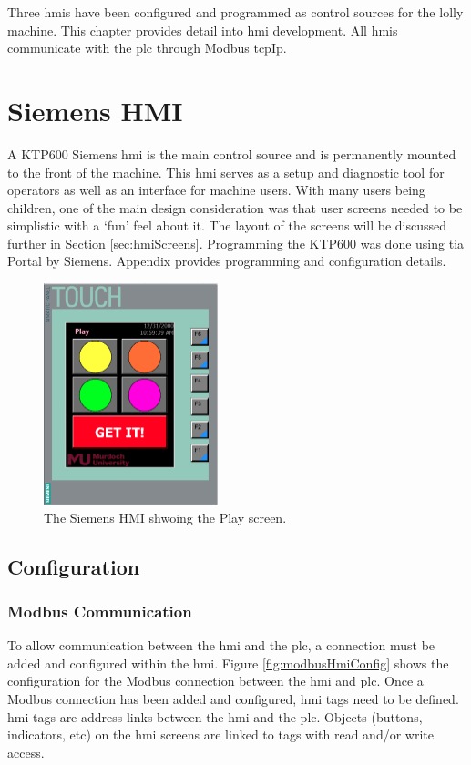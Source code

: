 Three \acrshort{hmi}s have been configured and programmed as control sources for the lolly machine. This chapter provides detail into \acrshort{hmi} development. All \acrshort{hmi}s communicate with the \acrshort{plc} through Modbus \acrshort{tcpIp}.

\section{Siemens HMI}
    A KTP600 Siemens \acrshort{hmi} is the main control source and is permanently mounted to the front of the machine. This \acrshort{hmi} serves as a setup and diagnostic tool for operators as well as an interface for machine users. With many users being children, one of the main design consideration was that user screens needed to be simplistic with a `fun' feel about it. The layout of the screens will be discussed further in Section \ref{sec:hmiScreens}. Programming the KTP600 was done using \acrfull{tia} Portal by Siemens. Appendix  provides programming and configuration details.

        \begin{figure}[H]
            \centering
            \includegraphics[width = 0.45\textwidth]{2_images/hmiPlay}
            \caption{The Siemens HMI shwoing the Play screen.}
            \label{fig:hmiPlay}
        \end{figure}    
    
    \subsection{Configuration}
        \subsubsection{Modbus Communication}
            To allow communication between the \acrshort{hmi} and the \acrshort{plc}, a connection must be added and configured within the \acrshort{hmi}. Figure \ref{fig:modbusHmiConfig} shows the configuration for the Modbus connection between the \acrshort{hmi} and \acrshort{plc}. Once a Modbus connection has been added and configured, \acrshort{hmi} tags need to be defined. \acrshort{hmi} tags are address links between the \acrshort{hmi} and the \acrshort{plc}. Objects (buttons, indicators, etc) on the \acrshort{hmi} screens are linked to tags with read and/or write access. 
            
